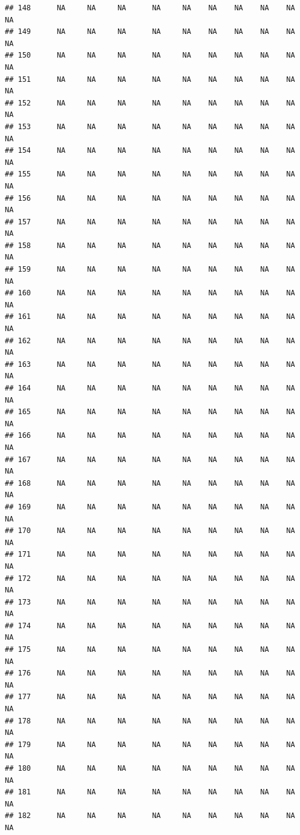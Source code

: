 \documentclass{article}\usepackage{graphicx, color}
\makeatletter
\newenvironment{kframe}{%
 \def\at@end@of@kframe{}%
 \ifinner\ifhmode%
  \def\at@end@of@kframe{\end{minipage}}%
  \begin{minipage}{\columnwidth}%
 \fi\fi%
 \def\FrameCommand##1{\hskip\@totalleftmargin \hskip-\fboxsep
 \colorbox{shadecolor}{##1}\hskip-\fboxsep
     \hskip-\linewidth \hskip-\@totalleftmargin \hskip\columnwidth}%
 \MakeFramed {\advance\hsize-\width
   \@totalleftmargin\z@ \linewidth\hsize
   \@setminipage}}%
 {\par\unskip\endMakeFramed%
 \at@end@of@kframe}
\newenvironment{knitrout}{}{} %
\makeatother
\begin{document}
\begin{knitrout}
\begin{kframe}
\begin{verbatim}
## 148      NA     NA     NA      NA     NA    NA    NA    NA    NA     NA
## 149      NA     NA     NA      NA     NA    NA    NA    NA    NA     NA
## 150      NA     NA     NA      NA     NA    NA    NA    NA    NA     NA
## 151      NA     NA     NA      NA     NA    NA    NA    NA    NA     NA
## 152      NA     NA     NA      NA     NA    NA    NA    NA    NA     NA
## 153      NA     NA     NA      NA     NA    NA    NA    NA    NA     NA
## 154      NA     NA     NA      NA     NA    NA    NA    NA    NA     NA
## 155      NA     NA     NA      NA     NA    NA    NA    NA    NA     NA
## 156      NA     NA     NA      NA     NA    NA    NA    NA    NA     NA
## 157      NA     NA     NA      NA     NA    NA    NA    NA    NA     NA
## 158      NA     NA     NA      NA     NA    NA    NA    NA    NA     NA
## 159      NA     NA     NA      NA     NA    NA    NA    NA    NA     NA
## 160      NA     NA     NA      NA     NA    NA    NA    NA    NA     NA
## 161      NA     NA     NA      NA     NA    NA    NA    NA    NA     NA
## 162      NA     NA     NA      NA     NA    NA    NA    NA    NA     NA
## 163      NA     NA     NA      NA     NA    NA    NA    NA    NA     NA
## 164      NA     NA     NA      NA     NA    NA    NA    NA    NA     NA
## 165      NA     NA     NA      NA     NA    NA    NA    NA    NA     NA
## 166      NA     NA     NA      NA     NA    NA    NA    NA    NA     NA
## 167      NA     NA     NA      NA     NA    NA    NA    NA    NA     NA
## 168      NA     NA     NA      NA     NA    NA    NA    NA    NA     NA
## 169      NA     NA     NA      NA     NA    NA    NA    NA    NA     NA
## 170      NA     NA     NA      NA     NA    NA    NA    NA    NA     NA
## 171      NA     NA     NA      NA     NA    NA    NA    NA    NA     NA
## 172      NA     NA     NA      NA     NA    NA    NA    NA    NA     NA
## 173      NA     NA     NA      NA     NA    NA    NA    NA    NA     NA
## 174      NA     NA     NA      NA     NA    NA    NA    NA    NA     NA
## 175      NA     NA     NA      NA     NA    NA    NA    NA    NA     NA
## 176      NA     NA     NA      NA     NA    NA    NA    NA    NA     NA
## 177      NA     NA     NA      NA     NA    NA    NA    NA    NA     NA
## 178      NA     NA     NA      NA     NA    NA    NA    NA    NA     NA
## 179      NA     NA     NA      NA     NA    NA    NA    NA    NA     NA
## 180      NA     NA     NA      NA     NA    NA    NA    NA    NA     NA
## 181      NA     NA     NA      NA     NA    NA    NA    NA    NA     NA
## 182      NA     NA     NA      NA     NA    NA    NA    NA    NA     NA

\end{verbatim}
\end{kframe}
\end{knitrout}
\end{document}

